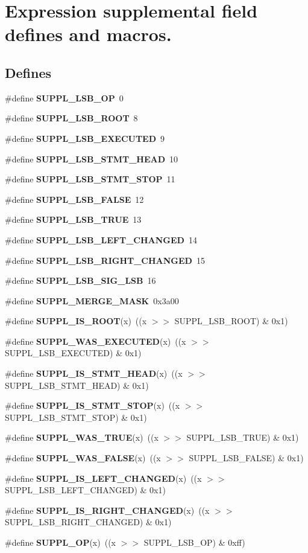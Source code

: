 \section{Expression supplemental field defines and macros.}
\label{group__expr__suppl}
\subsection*{Defines}
\begin{CompactItemize}
\item 
\#define {\bf SUPPL\_\-LSB\_\-OP}\ 0
\item 
\#define {\bf SUPPL\_\-LSB\_\-ROOT}\ 8
\item 
\#define {\bf SUPPL\_\-LSB\_\-EXECUTED}\ 9
\item 
\#define {\bf SUPPL\_\-LSB\_\-STMT\_\-HEAD}\ 10
\item 
\#define {\bf SUPPL\_\-LSB\_\-STMT\_\-STOP}\ 11
\item 
\#define {\bf SUPPL\_\-LSB\_\-FALSE}\ 12
\item 
\#define {\bf SUPPL\_\-LSB\_\-TRUE}\ 13
\item 
\#define {\bf SUPPL\_\-LSB\_\-LEFT\_\-CHANGED}\ 14
\item 
\#define {\bf SUPPL\_\-LSB\_\-RIGHT\_\-CHANGED}\ 15
\item 
\#define {\bf SUPPL\_\-LSB\_\-SIG\_\-LSB}\ 16
\item 
\#define {\bf SUPPL\_\-MERGE\_\-MASK}\ 0x3a00
\item 
\#define {\bf SUPPL\_\-IS\_\-ROOT}(x)\ ((x $>$$>$ SUPPL\_\-LSB\_\-ROOT) \& 0x1)
\item 
\#define {\bf SUPPL\_\-WAS\_\-EXECUTED}(x)\ ((x $>$$>$ SUPPL\_\-LSB\_\-EXECUTED) \& 0x1)
\item 
\#define {\bf SUPPL\_\-IS\_\-STMT\_\-HEAD}(x)\ ((x $>$$>$ SUPPL\_\-LSB\_\-STMT\_\-HEAD) \& 0x1)
\item 
\#define {\bf SUPPL\_\-IS\_\-STMT\_\-STOP}(x)\ ((x $>$$>$ SUPPL\_\-LSB\_\-STMT\_\-STOP) \& 0x1)
\item 
\#define {\bf SUPPL\_\-WAS\_\-TRUE}(x)\ ((x $>$$>$ SUPPL\_\-LSB\_\-TRUE) \& 0x1)
\item 
\#define {\bf SUPPL\_\-WAS\_\-FALSE}(x)\ ((x $>$$>$ SUPPL\_\-LSB\_\-FALSE) \& 0x1)
\item 
\#define {\bf SUPPL\_\-IS\_\-LEFT\_\-CHANGED}(x)\ ((x $>$$>$ SUPPL\_\-LSB\_\-LEFT\_\-CHANGED) \& 0x1)
\item 
\#define {\bf SUPPL\_\-IS\_\-RIGHT\_\-CHANGED}(x)\ ((x $>$$>$ SUPPL\_\-LSB\_\-RIGHT\_\-CHANGED) \& 0x1)
\item 
\#define {\bf SUPPL\_\-OP}(x)\ ((x $>$$>$ SUPPL\_\-LSB\_\-OP) \& 0xff)
\end{CompactItemize}


